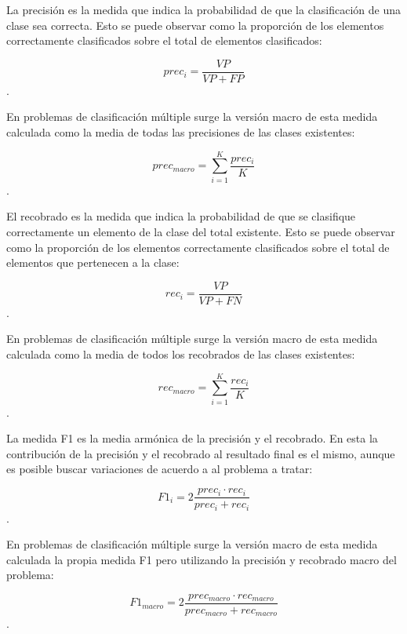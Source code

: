 La precisión es la medida que indica la probabilidad de que la clasificación de una clase sea correcta. Esto 
se puede observar como la proporción de los elementos correctamente clasificados sobre el total de 
elementos clasificados:

\begin{equation}
	prec_i = \frac{VP}{VP + FP}
\end{equation}.

En problemas de clasificación múltiple surge la versión macro de esta medida calculada como la media de todas
las precisiones de las clases existentes:

\begin{equation}
	prec_{macro} = \sum^K_{i=1} \frac{prec_i}{K}
\end{equation}.

El recobrado es la medida que indica la probabilidad de que se clasifique correctamente un elemento de la clase
del total existente. Esto se puede observar como la proporción de los elementos correctamente clasificados sobre el 
total de elementos que pertenecen a la clase:

\begin{equation}
	rec_i = \frac{VP}{VP + FN}
\end{equation}.

En problemas de clasificación múltiple surge la versión macro de esta medida calculada como la media de todos
los recobrados de las clases existentes:

\begin{equation}
	rec_{macro} = \sum^K_{i=1} \frac{rec_i}{K}
\end{equation}.

La medida F1 es la media armónica de la precisión y el recobrado. En esta la contribución de la precisión y el
recobrado al resultado final es el mismo, aunque es posible buscar variaciones de acuerdo a al problema a tratar:

\begin{equation}
	F1_i = 2 \frac{prec_i \cdot rec_i}{prec_i + rec_i}
\end{equation}.

En problemas de clasificación múltiple surge la versión macro de esta medida calculada la propia medida F1 pero
utilizando la precisión y recobrado macro del problema:

\begin{equation}
	F1_{macro} = 2 \frac{prec_{macro} \cdot rec_{macro}}{prec_{macro} + rec_{macro}}
\end{equation}.

